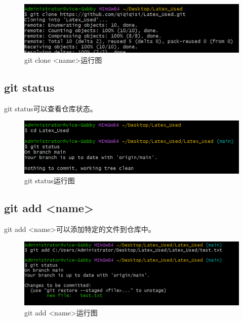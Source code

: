 \documentclass{article}
\begin{document}
\begin{figure}[H]
    \centering
    \includegraphics[width=1\linewidth]{git_clone.png}
    \caption{git clone <name>运行图}
    \label{fig:clone1}
\end{figure}

\subsection{git status}
git status可以查看仓库状态。
\begin{figure}[H]
    \centering
    \includegraphics[width=1\linewidth]{git_status.png}
    \caption{git status运行图}
    \label{fig:status}
\end{figure}

\subsection{git add <name>}
git add <name>可以添加特定的文件到仓库中。
\begin{figure}[H]
    \centering
    \includegraphics[width=1\linewidth]{git_add_name.png}
    \caption{git add <name>运行图}
    \label{fig:add}
\end{figure}
\end{document}
